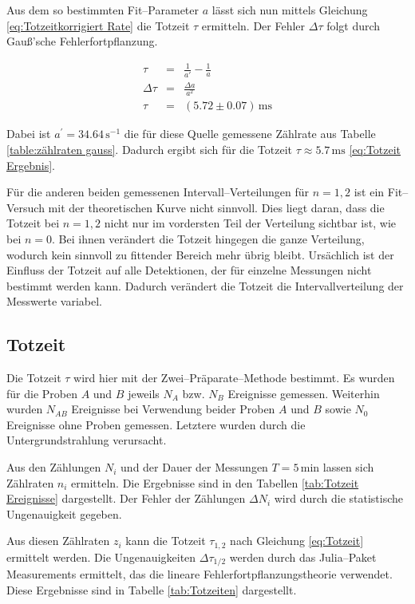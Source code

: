\documentclass[12pt,a4paper]{scrartcl}
\numberwithin{equation}{section} %
\newcommand{\code}[1]{\textsf{#1}}
\begin{document}
Aus dem so bestimmten Fit--Parameter $a$ lässt sich nun mittels Gleichung \eqref{eq:Totzeitkorrigiert Rate} die Totzeit $\tau$ ermitteln. Der Fehler $\Delta \tau$ folgt durch Gauß'sche Fehlerfortpflanzung.

\begin{eqnarray}
	\tau &=& \frac{1}{a'} - \frac{1}{a} \\
	\Delta \tau &=& \frac{\Delta a}{a^2} \\
	\tau &=& (5.72 \pm 0.07) \mathrm{\, ms} \label{eq:Totzeit Ergebnis}
\end{eqnarray}

\noindent
Dabei ist $a^\prime = 34.64 \mathrm{\,s^{-1}}$ die für diese Quelle gemessene Zählrate aus Tabelle \ref{table:zählraten gauss}. Dadurch ergibt sich für die Totzeit $\tau \approx 5.7 \mathrm{\, ms}$ \eqref{eq:Totzeit Ergebnis}.

Für die anderen beiden gemessenen Intervall--Verteilungen für $n = 1,2$ ist ein Fit--Versuch mit der theoretischen Kurve nicht sinnvoll. Dies liegt daran, dass die Totzeit bei $n = 1,2$ nicht nur im vordersten Teil der Verteilung sichtbar ist, wie bei $n = 0$. Bei ihnen verändert die Totzeit hingegen die ganze Verteilung, wodurch kein sinnvoll zu fittender Bereich mehr übrig bleibt. Ursächlich ist der Einfluss der Totzeit auf alle Detektionen, der für einzelne Messungen nicht bestimmt werden kann. Dadurch verändert die Totzeit die Intervallverteilung der Messwerte variabel.

\hypertarget{Totzeit bestimmen}{\subsection{Totzeit}\label{Totzeit bestimmen}}
Die Totzeit $\tau$ wird hier mit der Zwei--Präparate--Methode bestimmt. Es wurden für die Proben $A$ und $B$ jeweils $N_A$ bzw. $N_B$ Ereignisse gemessen. Weiterhin wurden $N_{AB}$ Ereignisse bei Verwendung beider Proben $A$ und $B$ sowie $N_0$ Ereignisse ohne Proben gemessen. Letztere wurden durch die Untergrundstrahlung verursacht.

Aus den Zählungen $N_i$ und der Dauer der Messungen $T=5\mathrm{\,min}$ lassen sich Zählraten $n_i$ ermitteln. Die Ergebnisse sind in den Tabellen \ref{tab:Totzeit Ereignisse} dargestellt. Der Fehler der Zählungen $\Delta N_i$ wird durch die statistische Ungenauigkeit gegeben.

Aus diesen Zählraten $z_i$ kann die Totzeit $\tau_{1,2}$ nach Gleichung \eqref{eq:Totzeit} ermittelt werden. Die Ungenauigkeiten $\Delta \tau_{1/2}$ werden durch das \code{Julia}--Paket \code{Measurements} ermittelt, das die lineare Fehlerfortpflanzungstheorie verwendet. \cite{Julia:Measurements} Diese Ergebnisse sind in Tabelle \ref{tab:Totzeiten} dargestellt.
\end{document}
